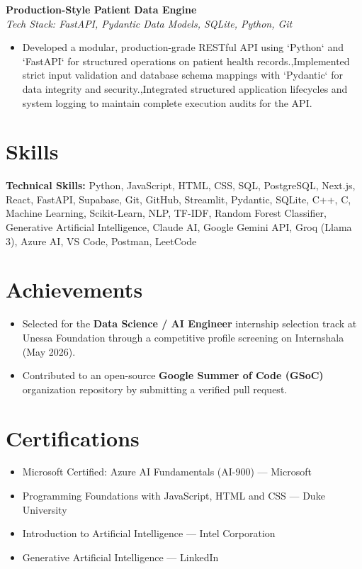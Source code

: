 \documentclass[11pt,a4paper]{article}
\begin{document}
\vspace{0.15cm}

\textbf{Production-Style Patient Data Engine}\\
\textit{Tech Stack: FastAPI, Pydantic Data Models, SQLite, Python, Git}\\
\begin{itemize}
    \item Developed a modular, production-grade RESTful API using `Python` and `FastAPI` for structured operations on patient health records.,Implemented strict input validation and database schema mappings with `Pydantic` for data integrity and security.,Integrated structured application lifecycles and system logging to maintain complete execution audits for the API.
\end{itemize}

\vspace{0.15cm}



\section*{Skills}
\textbf{Technical Skills:} Python, JavaScript, HTML, CSS, SQL, PostgreSQL, Next.js, React, FastAPI, Supabase, Git, GitHub, Streamlit, Pydantic, SQLite, C++, C, Machine Learning, Scikit-Learn, NLP, TF-IDF, Random Forest Classifier, Generative Artificial Intelligence, Claude AI, Google Gemini API, Groq (Llama 3), Azure AI, VS Code, Postman, LeetCode\\

\section*{Achievements}
\begin{itemize}
    \item Selected for the \textbf{Data Science / AI Engineer} internship selection track at Unessa Foundation through a competitive profile screening on Internshala (May 2026).
    \item Contributed to an open-source \textbf{Google Summer of Code (GSoC)} organization repository by submitting a verified pull request.
\end{itemize}

\section*{Certifications}
\begin{itemize}
    \item Microsoft Certified: Azure AI Fundamentals (AI-900) --- Microsoft
    \item Programming Foundations with JavaScript, HTML and CSS --- Duke University
    \item Introduction to Artificial Intelligence --- Intel Corporation
    \item Generative Artificial Intelligence --- LinkedIn
\end{itemize}
\end{document}
